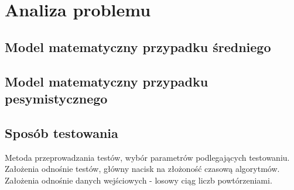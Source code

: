 \chapter{Analiza problemu}

\section{Model matematyczny przypadku średniego}

\section{Model matematyczny przypadku pesymistycznego}

\section{Sposób testowania}
Metoda przeprowadzania testów, wybór parametrów podlegających testowaniu. 
Założenia odnośnie testów, główny nacisk na złożoność czasową algorytmów.
Założenia odnośnie danych wejściowych - losowy ciąg liczb powtórzeniami.
